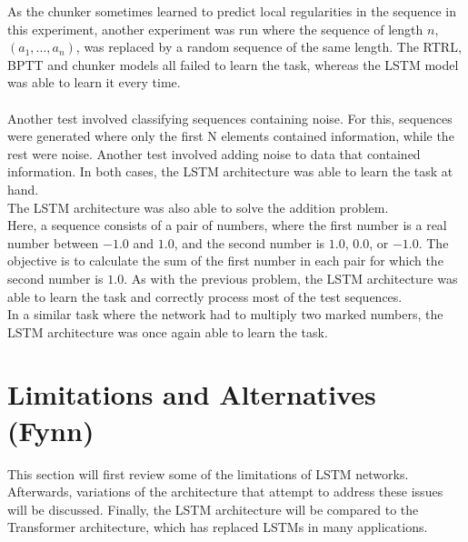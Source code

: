\documentclass[twoside,a4paper,10pt,DIV=12,BCOR=12mm]{scrartcl}
\begin{document}
As the chunker sometimes learned to predict local regularities in the sequence in this experiment, another experiment was run where the sequence of length $n$, $(a_1, ..., a_n)$, was replaced by a random sequence of the same length. The RTRL, BPTT and chunker models all failed to learn the task, whereas the LSTM model was able to learn it every time.\cite{hochreiter1997lstm}\\
\\
Another test involved classifying sequences containing noise. For this, sequences were generated where only the first N elements contained information, while the rest were noise. Another test involved adding noise to data that contained information. In both cases, the LSTM architecture was able to learn the task at hand.\cite{hochreiter1997lstm}
\\
The LSTM architecture was also able to solve the addition problem.\cite{hochreiter1997lstm}\\
Here, a sequence consists of a pair of numbers, where the first number is a real number between $-1.0$ and $1.0$, and the second number is $1.0$, $0.0$, or $-1.0$. The objective is to calculate the sum of the first number in each pair for which the second number is $1.0$. As with the previous problem, the LSTM architecture was able to learn the task and correctly process most of the test sequences.\cite{hochreiter1997lstm}\\
In a similar task where the network had to multiply two marked numbers, the LSTM architecture was once again able to learn the task. \cite{hochreiter1997lstm}
\section{Limitations and Alternatives (Fynn)}

This section will first review some of the limitations of LSTM networks. Afterwards, variations of the architecture that attempt to address these issues will be discussed. Finally, the LSTM architecture will be compared to the Transformer architecture, which has replaced LSTMs in many applications.
\end{document}
